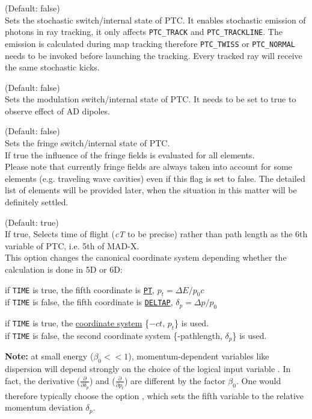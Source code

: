 \begin{madlist}
	 (Default: false)\\    
	Sets the stochastic switch/internal state of PTC. 
	It enables stochastic emission of photons in ray tracking,  
                    it only affects \texttt{PTC\_TRACK} and \texttt{PTC\_TRACKLINE}.
	The emission is calculated during map tracking therefore 
	\texttt{PTC\_TWISS} or \texttt{PTC\_NORMAL} needs to be invoked before 
	launching the tracking. Every tracked ray will receive the same stochastic kicks.

	 (Default: false)\\    
	Sets the modulation switch/internal state of PTC. 
	It needs to be set to true to observe effect of AD dipoles.
	
	 (Default: false)\\    
	Sets the fringe switch/internal state of PTC. \\ 
	If true the influence of the fringe fields is evaluated for all
	elements. \\       
	Please note that currently fringe fields are always taken into
	account for some elements (e.g. traveling wave cavities) even if
	this flag is set to false. The detailed list of elements
	will be provided later, when the situation in this matter will be
	definitely settled.    
	
	 (Default: true)\\  
	If true, Selects time of flight (\textit{cT} to be precise) rather
	than path length as the 6th variable of PTC, i.e. 5th of MAD-X. \\
                    This option changes the canonical coordinate system depending
	whether the calculation is done in 5D or 6D: 
	 \begin{madlist}
	    if \texttt{TIME} is true, the fifth coordinate is
	   \hyperref[subsec:tables-canon]{\texttt{PT}},
	   $p_t = \Delta E / p_0 c$ \\  
	   if \texttt{TIME} is false, the fifth coordinate is
	   \hyperref[subsec:tables-canon]{\texttt{DELTAP}},
	   $\delta_p = \Delta p / p_0$

	    if \texttt{TIME} is true, the
	   \hyperref[subsec:tables-canon]{\madx coordinate system}
	   \{$-ct$, $p_t$\} is used. \\    
	   if \texttt{TIME} is false, the second \ptc coordinate system
	   \{-pathlength, $\delta_p$\} is used. 
	 \end{madlist}

	\textbf{Note:} at small energy ($\beta_0 << 1$),
	momentum-dependent variables like dispersion will depend  strongly on
	the choice of  the logical input variable .  In fact, the
	derivative ($\frac{\partial}{\partial \delta_p}$)  and
	($\frac{\partial}{\partial p_t}$)  are different by the
	factor $\beta_0$. One would  therefore typically  choose
	the option ,  which sets the fifth variable to
	the relative momentum deviation $\delta_p$.

	
\end{madlist}

